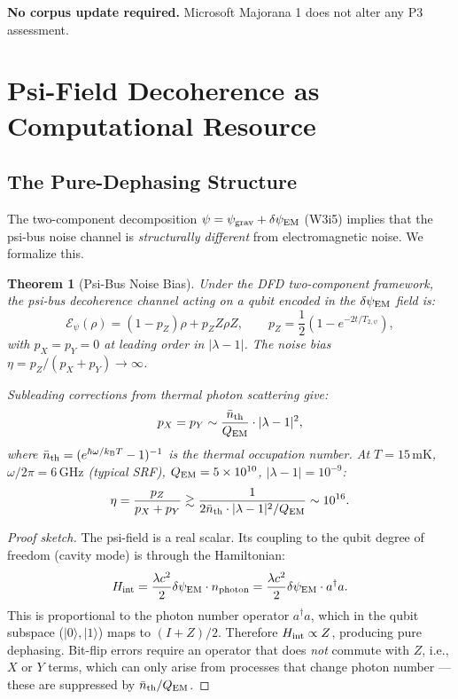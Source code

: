 \documentclass[11pt]{article}
\newtheorem{theorem}{Theorem}[section]
\theoremstyle{definition}
\theoremstyle{remark}
\newcommand{\kB}{k_{\mathrm{B}}}
\newcommand{\lamdiff}{|\lambda-1|}
\newcommand{\psigrav}{\psi_{\rm grav}}
\newcommand{\dpsiEM}{\delta\psi_{\rm EM}}
\begin{document}
\textbf{No corpus update required.}  Microsoft Majorana 1 does not alter
any P3 assessment.

\section{Psi-Field Decoherence as Computational Resource}
\label{sec:decoherence-resource}

\subsection{The Pure-Dephasing Structure}
\label{sec:pure-dephasing}

The two-component decomposition $\psi = \psigrav + \dpsiEM$ (W3i5) implies
that the psi-bus noise channel is \emph{structurally different} from
electromagnetic noise.  We formalize this.

\begin{theorem}[Psi-Bus Noise Bias]
\label{thm:noise-bias}
Under the DFD two-component framework, the psi-bus decoherence channel
acting on a qubit encoded in the $\dpsiEM$ field is:
\begin{equation}
  \mathcal{E}_\psi(\rho) = (1 - p_Z)\rho + p_Z Z\rho Z,
  \qquad p_Z = \frac{1}{2}\left(1 - e^{-2t/T_{2,\psi}}\right),
\end{equation}
with $p_X = p_Y = 0$ at leading order in $\lamdiff$.  The noise bias
$\eta = p_Z/(p_X + p_Y) \to \infty$.

Subleading corrections from thermal photon scattering give:
\begin{equation}
  p_X = p_Y \sim \frac{\bar{n}_{\rm th}}{Q_{\rm EM}} \cdot \lamdiff^2,
\end{equation}
where $\bar{n}_{\rm th} = (e^{\hbar\omega/\kB T} - 1)^{-1}$ is the
thermal occupation number.  At $T = 15\,\text{mK}$, $\omega/2\pi = 6\,\text{GHz}$
(typical SRF), $Q_{\rm EM} = 5 \times 10^{10}$, $\lamdiff = 10^{-9}$:
\begin{equation}
  \eta = \frac{p_Z}{p_X + p_Y} \gtrsim \frac{1}{2\bar{n}_{\rm th} \cdot
  \lamdiff^2 / Q_{\rm EM}} \sim 10^{16}.
\end{equation}
\end{theorem}

\begin{proof}[Proof sketch]
The psi-field is a real scalar.  Its coupling to the qubit degree of
freedom (cavity mode) is through the Hamiltonian:
\begin{equation}
  H_{\rm int} = \frac{\lambda c^2}{2} \dpsiEM \cdot n_{\rm photon}
  = \frac{\lambda c^2}{2} \dpsiEM \cdot a^\dagger a.
\end{equation}
This is proportional to the photon number operator $a^\dagger a$, which
in the qubit subspace ($|0\rangle, |1\rangle$) maps to $(I + Z)/2$.
Therefore $H_{\rm int} \propto Z$, producing pure dephasing.  Bit-flip
errors require an operator that does \emph{not} commute with $Z$, i.e.,
$X$ or $Y$ terms, which can only arise from processes that change photon
number --- these are suppressed by $\bar{n}_{\rm th}/Q_{\rm EM}$.
\end{proof}
\end{document}
